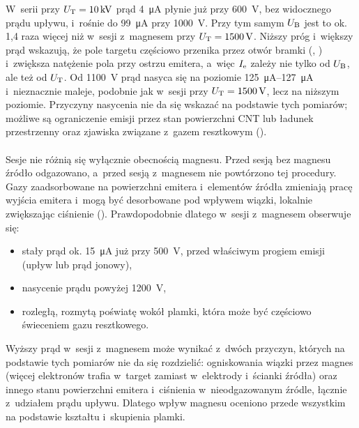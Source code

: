 W~serii przy $U_\mathrm{T}=\SI{10}{kV}$ prąd \SI{4}{\micro A} płynie już przy
\SI{600}{V}, bez widocznego prądu upływu, i~rośnie do \SI{99}{\micro A}
przy \SI{1000}{V}. Przy tym samym $U_\mathrm{B}$ jest to ok. 1,4 raza więcej
niż w~sesji z~magnesem przy $U_\mathrm{T}=\SI{1500}{V}$. Niższy próg i~większy
prąd wskazują, że pole targetu częściowo przenika przez otwór bramki
(, ) i~zwiększa natężenie pola przy ostrzu emitera, a~więc
$I_\mathrm{e}$ zależy nie tylko od $U_\mathrm{B}$, ale też od $U_\mathrm{T}$. Od \SI{1100}{V} prąd
nasyca się na poziomie \SIrange{125}{127}{\micro A} i~nieznacznie
maleje, podobnie jak w~sesji przy $U_\mathrm{T}=\SI{1500}{V}$, lecz na niższym
poziomie. Przyczyny nasycenia nie da się wskazać na podstawie tych
pomiarów; możliwe są ograniczenie emisji przez stan powierzchni CNT
lub ładunek przestrzenny oraz zjawiska związane z~gazem resztkowym
().

\paragraph{}

Sesje nie różnią się wyłącznie obecnością magnesu. Przed sesją bez
magnesu źródło odgazowano, a~przed sesją z~magnesem nie powtórzono tej
procedury. Gazy zaadsorbowane na powierzchni emitera i~elementów
źródła zmieniają pracę wyjścia emitera i~mogą być desorbowane pod
wpływem wiązki, lokalnie zwiększając ciśnienie ().
Prawdopodobnie dlatego w~sesji z~magnesem obserwuje się:
\begin{itemize}
  \item stały prąd ok. \SI{15}{\micro A} już przy \SI{500}{V}, przed
        właściwym progiem emisji (upływ lub prąd jonowy),
  \item nasycenie prądu powyżej \SI{1200}{V},
  \item rozległą, rozmytą poświatę wokół plamki, która może być
        częściowo świeceniem gazu resztkowego.
\end{itemize}

Wyższy prąd w~sesji z~magnesem może wynikać z~dwóch przyczyn, których na
podstawie tych pomiarów nie da się rozdzielić: ogniskowania wiązki
przez magnes (więcej elektronów trafia w~target zamiast w~elektrody
i~ścianki źródła) oraz innego stanu powierzchni emitera i~ciśnienia
w~nieodgazowanym źródle, łącznie z~udziałem prądu upływu. Dlatego
wpływ magnesu oceniono przede wszystkim na podstawie kształtu
i~skupienia plamki.


